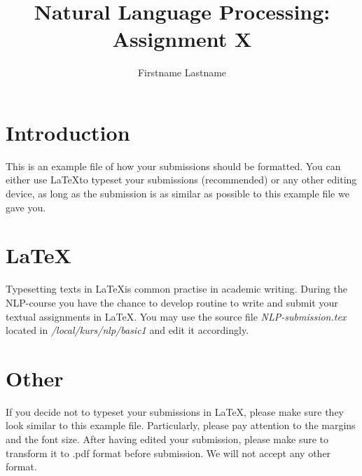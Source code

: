 \documentclass[11pt]{article} %
\title{{\LARGE Natural Language Processing: Assignment X}\\[1.5mm]} %
\author{Firstname Lastname} %
\begin{document}
\maketitle

\section{Introduction}
This is an example file of how your submissions should be formatted.
You can either use \LaTeX to typeset your submissions (recommended) or
any other editing device, as long as the submission is as similar as
possible to this example file we gave you.

\section{\LaTeX}
Typesetting texts in \LaTeX is common practise in academic
writing. During the NLP-course you have the chance to develop routine
to write and submit your textual assignments in \LaTeX. You may use
the source file \emph{NLP-submission.tex} located in
\emph{/local/kurs/nlp/basic1} and edit it accordingly.

\section{Other}
If you decide not to typeset your submissions in \LaTeX, please make
sure they look similar to this example file. Particularly, please pay
attention to the margins and the font size. After having edited your
submission, please make sure to transform it to .pdf format before
submission. We will not accept any other format.
\end{document}
